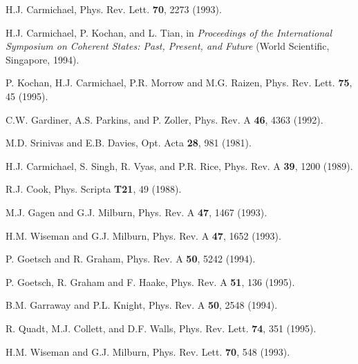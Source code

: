 \begin{thebibliography}{99}
H.J. Carmichael,
Phys. Rev. Lett. {\bf 70}, 2273 (1993).

H.J. Carmichael, P. Kochan, and L. Tian,
in {\em Proceedings of the International Symposium on Coherent 
States: Past, Present, and Future}
(World Scientific, Singapore, 1994).

P. Kochan, H.J. Carmichael, P.R. Morrow and M.G. Raizen,
Phys. Rev. Lett. {\bf 75}, 45 (1995).

C.W. Gardiner, A.S. Parkins, and P. Zoller,
Phys. Rev. A {\bf 46}, 4363 (1992).

M.D. Srinivas and E.B. Davies,
Opt. Acta {\bf 28}, 981 (1981).

H.J. Carmichael, S. Singh, R. Vyas, and P.R. Rice,
Phys. Rev. A {\bf 39}, 1200 (1989).

R.J. Cook, %
Phys. Scripta {\bf T21}, 49 (1988).

M.J. Gagen and G.J. Milburn,
Phys. Rev. A {\bf 47}, 1467 (1993).

H.M. Wiseman and G.J. Milburn,
Phys. Rev. A {\bf 47}, 1652  (1993).

P. Goetsch and R. Graham,
Phys. Rev. A {\bf 50}, 5242 (1994).

P. Goetsch, R. Graham and F. Haake,
Phys. Rev. A {\bf 51}, 136 (1995).

B.M. Garraway and P.L. Knight,
Phys. Rev. A {\bf 50}, 2548 (1994).

R. Quadt, M.J. Collett, and D.F. Walls,
Phys. Rev. Lett. {\bf 74}, 351 (1995).

H.M. Wiseman and G.J. Milburn,
Phys. Rev. Lett. {\bf 70}, 548 (1993).


\end{thebibliography}
